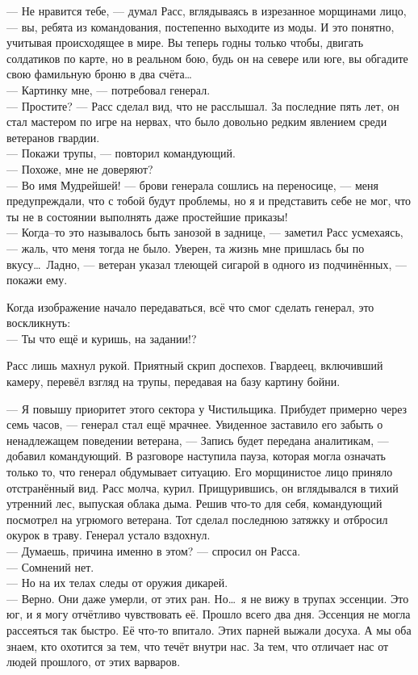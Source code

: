 \noindent --- Не нравится тебе, --- думал Расс, вглядываясь в изрезанное 
морщинами лицо, --- вы, ребята из командования, постепенно выходите из моды. И 
это понятно, учитывая происходящее в мире. Вы теперь годны только чтобы, 
двигать солдатиков по карте, но в реальном бою, будь он на севере или юге, вы 
обгадите свою фамильную броню в два счёта\ldots \\
--- Картинку мне, --- потребовал генерал.\\
--- Простите? --- Расс сделал вид, что не расслышал. За последние пять лет, он 
стал мастером по игре на нервах, что было довольно редким явлением среди 
ветеранов гвардии. \\
--- Покажи трупы, --- повторил командующий.\\ 
--- Похоже, мне не доверяют?  \\
--- Во имя Мудрейшей! --- брови генерала сошлись на переносице, --- меня 
предупреждали, что с тобой будут проблемы, но я и представить себе не мог, что 
ты не в состоянии выполнять даже простейшие приказы! \\
--- Когда--то это называлось быть занозой в заднице, --- заметил Расс 
усмехаясь, --- жаль, что меня тогда не было. Уверен, та жизнь мне пришлась бы 
по вкусу\ldots\ Ладно, --- ветеран указал тлеющей сигарой в одного из 
подчинённых, --- покажи ему.
    
Когда изображение начало передаваться, всё что смог сделать генерал, это 
воскликнуть:\\
--- Ты что ещё и куришь, на задании!?

Расс лишь махнул рукой. Приятный скрип доспехов. Гвардеец, включивший камеру, 
перевёл взгляд на трупы, передавая на базу картину бойни.

\noindent --- Я повышу приоритет этого сектора у Чистильщика. Прибудет примерно 
через семь часов, --- генерал стал ещё мрачнее. Увиденное заставило его забыть 
о ненадлежащем поведении ветерана, --- Запись будет передана аналитикам, --- 
добавил командующий. В разговоре наступила пауза, которая могла означать только 
то, что генерал обдумывает ситуацию. Его морщинистое лицо приняло отстранённый 
вид. Расс молча, курил. Прищурившись, он вглядывался в тихий утренний лес, 
выпуская облака дыма. Решив что-то для себя, командующий посмотрел на угрюмого 
ветерана. Тот сделал последнюю затяжку и отбросил окурок в траву. Генерал устало 
вздохнул. \\
--- Думаешь, причина именно в этом? --- спросил он Расса.\\
--- Сомнений нет.\\
--- Но на их телах следы от оружия дикарей. \\
--- Верно. Они даже умерли, от этих ран. Но\ldots\ я не вижу в трупах эссенции. 
Это юг, и я могу отчётливо чувствовать её. Прошло всего два дня. Эссенция не 
могла рассеяться так быстро. Её что-то впитало. Этих парней выжали досуха. А мы 
оба знаем, кто охотится за тем, что течёт внутри нас. За тем, что отличает нас 
от людей прошлого, от этих варваров.

